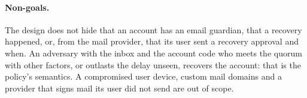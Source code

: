 \paragraph{Non-goals.} The design does not hide that an account has an email
guardian, that a recovery happened, or, from the mail provider, that its user
sent a recovery approval and when. An adversary with the inbox and the
account code who meets the quorum with other factors, or outlasts the delay
unseen, recovers the account: that is the policy's semantics. A compromised
user device, custom mail domains and a provider that signs mail its user did
not send are out of scope.
